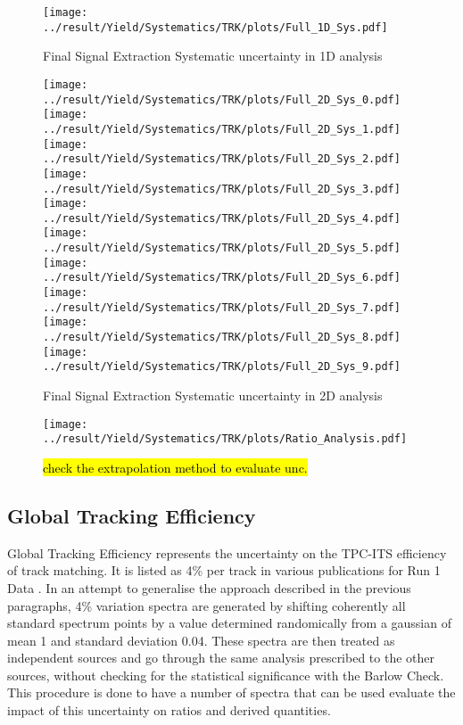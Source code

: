 \begin{figure}
	\centering
		\texttt{[image: ../result/Yield/Systematics/TRK/plots/Full\_1D\_Sys.pdf]}
		\caption{Final Signal Extraction Systematic uncertainty in 1D analysis}
		\label{}
\end{figure}

\begin{figure}
	\centering
		\texttt{[image: ../result/Yield/Systematics/TRK/plots/Full\_2D\_Sys\_0.pdf]}
		\texttt{[image: ../result/Yield/Systematics/TRK/plots/Full\_2D\_Sys\_1.pdf]}
		\texttt{[image: ../result/Yield/Systematics/TRK/plots/Full\_2D\_Sys\_2.pdf]}\\
		\texttt{[image: ../result/Yield/Systematics/TRK/plots/Full\_2D\_Sys\_3.pdf]}
		\texttt{[image: ../result/Yield/Systematics/TRK/plots/Full\_2D\_Sys\_4.pdf]}
		\texttt{[image: ../result/Yield/Systematics/TRK/plots/Full\_2D\_Sys\_5.pdf]}\\
		\texttt{[image: ../result/Yield/Systematics/TRK/plots/Full\_2D\_Sys\_6.pdf]}
		\texttt{[image: ../result/Yield/Systematics/TRK/plots/Full\_2D\_Sys\_7.pdf]}
		\texttt{[image: ../result/Yield/Systematics/TRK/plots/Full\_2D\_Sys\_8.pdf]}\\
		\texttt{[image: ../result/Yield/Systematics/TRK/plots/Full\_2D\_Sys\_9.pdf]}
		\caption{Final Signal Extraction Systematic uncertainty in 2D analysis}
		\label{}
\end{figure}

\newpage
\begin{figure}
	\centering
		\texttt{[image: ../result/Yield/Systematics/TRK/plots/Ratio\_Analysis.pdf]}
		\caption{\hl{check the extrapolation method to evaluate unc.}}
		\label{}
\end{figure}

\subsection{Global Tracking Efficiency}
Global Tracking Efficiency represents the uncertainty on the TPC-ITS efficiency of track matching. It is listed as 4\% per track in various publications for Run 1 Data \cite{PrevPubMult}. In an attempt to generalise the approach described in the previous paragraphs, 4\% variation spectra are generated by shifting coherently all standard spectrum points by a value determined randomically from a gaussian of mean 1 and standard deviation 0.04. These spectra are then treated as independent sources and go through the same analysis prescribed to the other sources, without checking for the statistical significance with the Barlow Check. This procedure is done to have a number of spectra that can be used evaluate the impact of this uncertainty on ratios and derived quantities.

